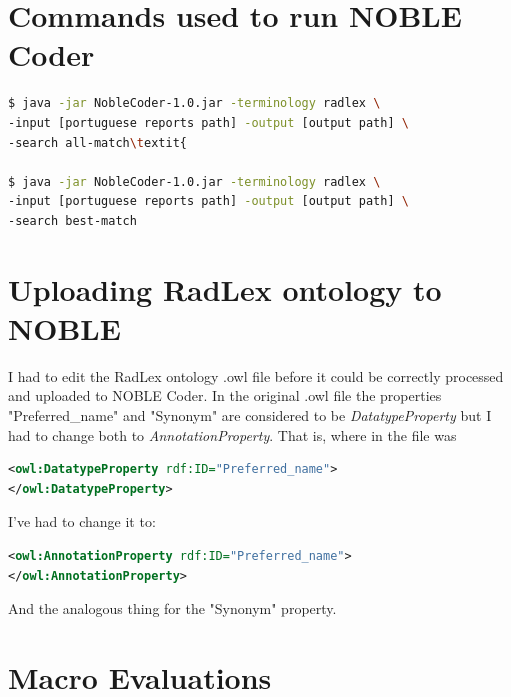 \label{appendices}

\renewcommand{\thechapter}{A}
\chapter{Commands used to run NOBLE Coder}
\label{app:commands_run_noble}

\begin{lstlisting}[language=bash]
$ java -jar NobleCoder-1.0.jar -terminology radlex \
-input [portuguese reports path] -output [output path] \
-search all-match\textit{

$ java -jar NobleCoder-1.0.jar -terminology radlex \
-input [portuguese reports path] -output [output path] \
-search best-match
\end{lstlisting}

\chapter{Uploading RadLex ontology to NOBLE}
\label{app:change_radlex_noble}

I had to edit the RadLex ontology .owl file before it could be correctly processed and uploaded to NOBLE Coder. In the original .owl file the properties  "Preferred\_name" and "Synonym" are considered to be \textit{DatatypeProperty} but I had to change both to \textit{AnnotationProperty}. That is, where in the file was

\begin{lstlisting}[language=xml]
<owl:DatatypeProperty rdf:ID="Preferred_name">
</owl:DatatypeProperty>
\end{lstlisting}

I've had to change it to:

\begin{lstlisting}[language=xml]
<owl:AnnotationProperty rdf:ID="Preferred_name">
</owl:AnnotationProperty>
\end{lstlisting}

And the analogous thing for the "Synonym" property.


\chapter{Macro Evaluations}
\label{app:macro_evaluations}

